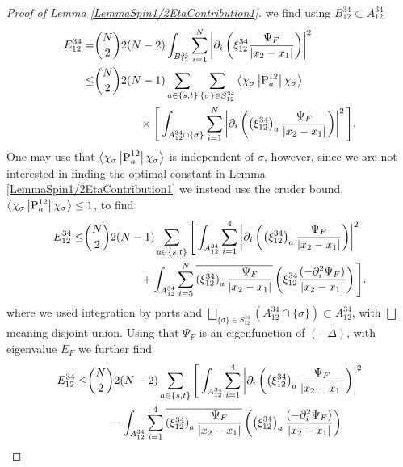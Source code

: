 \begin{proof}[Proof of Lemma \ref{LemmaSpin1/2EtaContribution1}]
we find using $ B_{12}^{34}\subset A_{12}^{34} $
\begin{equation}
\begin{aligned}
E_{12}^{34}=&\binom{N}{2}2(N-2)\int_{B_{12}^{34}}\sum_{i=1}^{N}\left\lvert \partial_i\left(\xi_{12}^{34} \frac{\Psi_F}{\left\lvert x_2-x_1 \right\rvert}\right) \right\rvert^2\\
\leq& \binom{N}{2}2(N-1)\sum_{a\in\{s,t\}}\sum_{\{\sigma\}\in S_{12}^{34}}\left\langle\chi_{\sigma}\left\lvert \operatorname{P}_a^{12}\right \rvert \chi_{\sigma}\right\rangle\\&\qquad\qquad\times\Bigg[\int_{A_{12}^{34}\cap\{\sigma\}}\sum_{i=1}^{N}\left\lvert \partial_i\left(\left(\xi_{12}^{34}\right)_a \frac{\Psi_F}{\left\lvert x_2-x_1 \right\rvert}\right) \right\rvert^2\Bigg].
\end{aligned}
\end{equation}
One may use that $ \left\langle\chi_{\sigma}\left\lvert \operatorname{P}_a^{12}\right \rvert \chi_{\sigma}\right\rangle $ is independent of $ \sigma $, however, since we are not interested in finding the optimal constant in Lemma \ref{LemmaSpin1/2EtaContribution1} we instead use the cruder bound, $ \left\langle\chi_{\sigma}\left\lvert \operatorname{P}_a^{12}\right \rvert \chi_{\sigma}\right\rangle\leq 1 $, to find
\begin{equation}
\begin{aligned}
E_{12}^{34}\leq& \binom{N}{2}2(N-1)\sum_{a\in\{s,t\}}\Bigg[\int_{A_{12}^{34}}\sum_{i=1}^{4}\left\lvert \partial_i\left(\left(\xi_{12}^{34}\right)_a \frac{\Psi_F}{\left\lvert x_2-x_1 \right\rvert}\right) \right\rvert^2 \\&\qquad\qquad\quad+\int_{A_{12}^{34}}\sum_{i=5}^{N}\overline{\left(\xi_{12}^{34}\right)_a \frac{\Psi_F}{\left\lvert x_2-x_1 \right\rvert}}\left(\xi_{12}^{34} \frac{(-\partial_i^2\Psi_F)}{\left\lvert x_2-x_1 \right\rvert}\right)\Bigg].
\end{aligned}
\end{equation}
where we used integration by parts and $ \bigsqcup_{\{\sigma\}\in S_{12}^{34}}\left(A_{12}^{34}\cap \{\sigma\}\right)\subset A_{12}^{34} $, with $\bigsqcup$ meaning disjoint union.  Using that $ \Psi_F $ is an eigenfunction of $ (-\Delta) $, with eigenvalue $ E_F $ we further find
\begin{equation}
\begin{aligned}
E_{12}^{34}\leq& \binom{N}{2}2(N-2)\sum_{a\in\{s,t\}}\Bigg[\int_{A_{12}^{34}}\sum_{i=1}^{4}\abs{\partial_i\left(\left(\xi_{12}^{34}\right)_a \frac{\Psi_F}{\abs{x_2-x_1}}\right)}^2 \\&\qquad-\int_{A_{12}^{34}}\sum_{i=1}^{4}\overline{\left(\xi_{12}^{34}\right)_a \frac{\Psi_F}{\abs{x_2-x_1}}}\left(\left(\xi_{12}^{34}\right)_a \frac{(-\partial_i^2\Psi_F)}{\abs{x_2-x_1}}\right)\\

\end{aligned}
\end{equation}
\end{proof}
